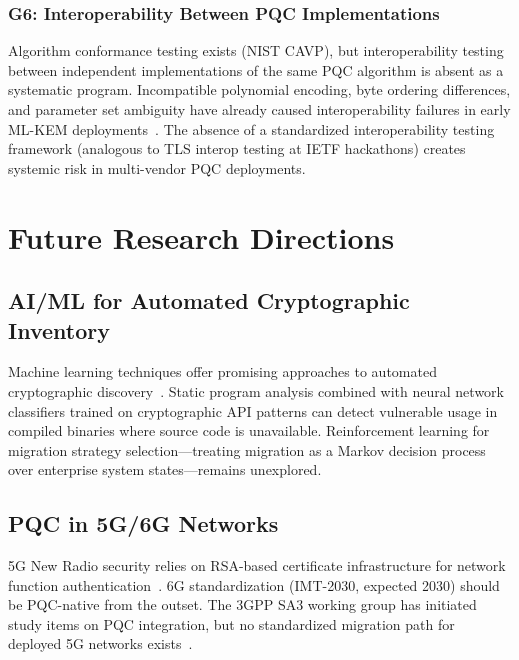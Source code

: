 \documentclass[journal]{IEEEtran}
\begin{document}
\subsubsection{G6: Interoperability Between PQC Implementations}

Algorithm conformance testing exists (NIST CAVP), but interoperability testing
between independent implementations of the same PQC algorithm is absent as a
systematic program. Incompatible polynomial encoding, byte ordering differences,
and parameter set ambiguity have already caused interoperability failures in
early ML-KEM deployments~\cite{oqs2024}. The absence of a standardized
interoperability testing framework (analogous to TLS interop testing at
IETF hackathons) creates systemic risk in multi-vendor PQC deployments.

\section{Future Research Directions}
\label{sec:future}

\subsection{AI/ML for Automated Cryptographic Inventory}

Machine learning techniques offer promising approaches to automated cryptographic
discovery~\cite{xiao2023machine,khalid2022ai}. Static program analysis combined
with neural network classifiers trained on cryptographic API patterns can detect
vulnerable usage in compiled binaries where source code is unavailable.
Reinforcement learning for migration strategy selection---treating migration as
a Markov decision process over enterprise system states---remains unexplored.

\subsection{PQC in 5G/6G Networks}

5G New Radio security relies on RSA-based certificate infrastructure for network
function authentication~\cite{3gpp2023security}. 6G standardization (IMT-2030,
expected 2030) should be PQC-native from the outset. The 3GPP SA3 working group
has initiated study items on PQC integration, but no standardized migration
path for deployed 5G networks exists~\cite{europeancommission2022b5g}.
\end{document}
